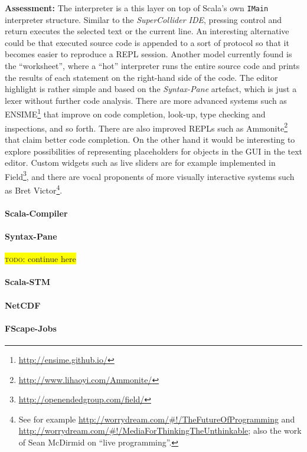 \documentclass[11pt,a4paper]{article}
\newcommand{\todo}[1]{\colorbox{yellow}{\textsc{todo}: #1}}
\newcommand{\software}[1]{\textit{#1}}
\begin{document}
\textbf{Assessment:} The interpreter is a this layer on top of Scala's own \verb!IMain! interpreter structure. Similar to the \software{SuperCollider IDE}, pressing control and return executes the selected text or the current line. An interesting alternative could be that executed source code is appended to a sort of protocol so that it becomes easier to reproduce a REPL session. Another model currently found is the ``worksheet'', where a ``hot'' interpreter runs the entire source code and prints the results of each statement on the right-hand side of the code. The editor highlight is rather simple and based on the \software{Syntax-Pane} artefact, which is just a lexer without further code analysis. There are more advanced systems such as ENSIME\footnote{\url{http://ensime.github.io/}} that improve on code completion, look-up, type checking and inspections, and so forth. There are also improved REPLs such as Ammonite\footnote{\url{http://www.lihaoyi.com/Ammonite/}} that claim better code completion. On the other hand it would be interesting to explore possibilities of representing placeholders for objects in the GUI in the text editor. Custom widgets such as live sliders are for example implemented in Field\footnote{\url{http://openendedgroup.com/field/}}, and there are vocal proponents of more visually interactive systems such as Bret Victor\footnote{See for example \url{http://worrydream.com/\#!/TheFutureOfProgramming} and \url{http://worrydream.com/\#!/MediaForThinkingTheUnthinkable}; 
also the work of Sean McDirmid on ``live programming''.}.

\paragraph{Scala-Compiler}

\paragraph{Syntax-Pane}


\todo{continue here}

\paragraph{Scala-STM}

\paragraph{NetCDF}

\paragraph{FScape-Jobs}
\end{document}
